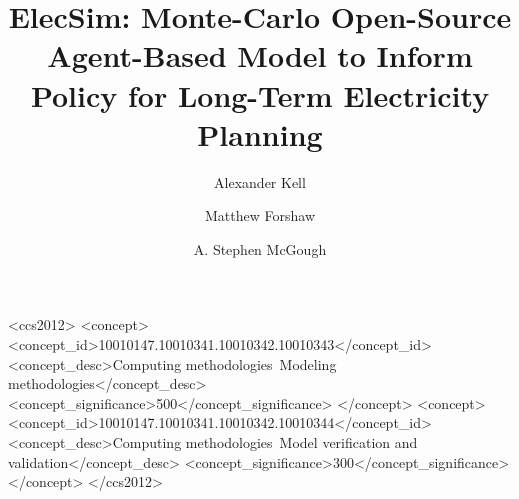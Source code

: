 \documentclass[sigconf]{acmart}
\begin{document}
%
\title[ElecSim: Market Model]{ElecSim: Monte-Carlo Open-Source Agent-Based Model to Inform Policy for Long-Term Electricity Planning}

%

\author{Alexander Kell}

\author{Matthew Forshaw}

\author{A. Stephen McGough}
 
%



%
\begin{abstract}


\end{abstract}

%
%
\begin{CCSXML}
<ccs2012>
<concept>
<concept_id>10010147.10010341.10010342.10010343</concept_id>
<concept_desc>Computing methodologies~Modeling methodologies</concept_desc>
<concept_significance>500</concept_significance>
</concept>
<concept>
<concept_id>10010147.10010341.10010342.10010344</concept_id>
<concept_desc>Computing methodologies~Model verification and validation</concept_desc>
<concept_significance>300</concept_significance>
</concept>
</ccs2012>
\end{CCSXML}
\end{document}
